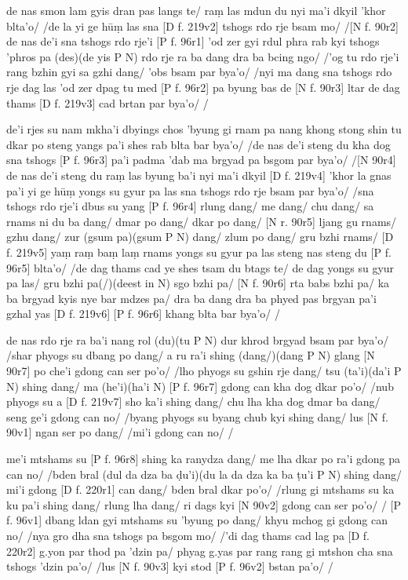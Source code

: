 \documentclass[naipra.tex]{subfiles}
\begin{document}
de nas smon lam gyis dran pas langs te/ raṃ las mdun du nyi ma'i dkyil 'khor blta'o/ /de la yi ge hūṃ las sna [D f. 219v2] tshogs rdo rje bsam mo/ /[N f. 90r2] de nas de'i sna tshogs rdo rje'i [P f. 96r1] 'od zer gyi rdul phra rab kyi tshogs 'phros pa (des)(de yis P N) rdo rje ra ba dang dra ba bcing ngo/ /'og tu rdo rje'i rang bzhin gyi sa gzhi dang/ 'obs bsam par bya'o/ /nyi ma dang sna tshogs rdo rje dag las 'od zer dpag tu med [P f. 96r2] pa byung bas de [N f. 90r3] ltar de dag thams [D f. 219v3] cad brtan par bya'o/ /

de'i rjes su nam mkha'i dbyings chos 'byung gi rnam pa nang khong stong shin tu dkar po steng yangs pa'i shes rab blta bar bya'o/ /de nas de'i steng du kha dog sna tshogs [P f. 96r3] pa'i padma 'dab ma brgyad pa bsgom par bya'o/ /[N 90r4] de nas de'i steng du raṃ las byung ba'i nyi ma'i dkyil [D f. 219v4] 'khor la gnas pa'i yi ge hūṃ yongs su gyur pa las sna tshogs rdo rje bsam par bya'o/ /sna tshogs rdo rje'i dbus su yang [P f. 96r4] rlung dang/ me dang/ chu dang/ sa rnams ni du ba dang/ dmar po dang/ dkar po dang/ [N r. 90r5] ljang gu rnams/ gzhu dang/ zur (gsum pa)(gsum P N) dang/ zlum po dang/ gru bzhi rnams/ [D f. 219v5] yaṃ raṃ baṃ laṃ rnams yongs su gyur pa las steng nas steng du [P f. 96r5] blta'o/ /de dag thams cad ye shes tsam du btags te/ de dag yongs su gyur pa las/ gru bzhi pa(/)(deest in N) sgo bzhi pa/ [N f. 90r6] rta babs bzhi pa/ ka ba brgyad kyis nye bar mdzes pa/ dra ba dang dra ba phyed pas brgyan pa'i gzhal yas [D f. 219v6] [P f. 96r6] khang blta bar bya'o/ /

de nas rdo rje ra ba'i nang rol (du)(tu P N) dur khrod brgyad bsam par bya'o/ /shar phyogs su dbang po dang/ a ru ra'i shing (dang/)(dang P N) glang [N 90r7] po che'i gdong can ser po'o/ /lho phyogs su gshin rje dang/ tsu (ta'i)(da'i P N) shing dang/ ma (he'i)(ha'i N) [P f. 96r7] gdong can kha dog dkar po'o/ /nub phyogs su a [D f. 219v7] sho ka'i shing dang/ chu lha kha dog dmar ba dang/ seng ge'i gdong can no/ /byang phyogs su byang chub kyi shing dang/ lus [N f. 90v1] ngan ser po dang/ /mi'i gdong can no/ /

me'i mtshams su [P f. 96r8] shing ka ranydza dang/ me lha dkar po ra'i gdong pa can no/ /bden bral (dul da dza ba ḍu'i)(du la da dza ka ba ṭu'i P N) shing dang/ mi'i gdong [D f. 220r1] can dang/ bden bral dkar po'o/ /rlung gi mtshams su ka ku pa'i shing dang/ rlung lha dang/ ri dags kyi [N 90v2] gdong can ser po'o/ / [P f. 96v1] dbang ldan gyi mtshams su 'byung po dang/ khyu mchog gi gdong can no/ /nya gro dha sna tshogs pa bsgom mo/ /'di dag thams cad lag pa [D f. 220r2] g.yon par thod pa 'dzin pa/ phyag g.yas par rang rang gi mtshon cha sna tshogs 'dzin pa'o/ /lus [N f. 90v3] kyi stod [P f. 96v2] bstan pa'o/ /
\end{document}
